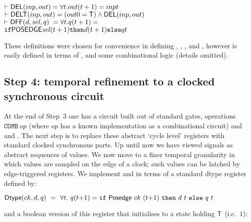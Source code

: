 \documentclass{llncs}
\begin{document}
\vspace*{-1mm}

{\begin{alltt}
\( \vdash \DEF{DEL}(inp,out)  = {\forall}t. out(t+1) = inp t                       \)
\( \vdash \DEF{DELT}(inp,out) = (out 0 = \DEF{T}) \wedge \DEF{DEL}(inp,out)                       \)
\( \vdash \DEF{DFF}(d,\VAR{sel},q)  \phantom{\hspace*{1mm}}= {\forall}t. q(t+1) = \)
\(                        \texttt{if} \DEF{POSEDGE} \VAR{sel} (t+1) \texttt{then} d(t+1) \texttt{else} q t \)
\end{alltt}}

\vspace*{-1mm}

These definitions were chosen for convenience in defining
, , ,  and ,
however  is easily defined in terms of
,  and some combinational logic (details omitted).

\vspace*{-3mm}

\subsection*{Step 4: temporal refinement to a clocked synchronous circuit}

At the end of Step~3 one has a circuit built out of standard gates,
operations $\texttt{COMB}~op$ (where $op$ has a known implementation as
a combinational circuit) and  and .  The
next step is to replace these abstract `cycle level' registers with
standard clocked synchronous parts. Up until now we have viewed
signals as abstract sequences of values.  We now move to a finer
temporal granularity in which values are sampled on the edge of a
clock; such values can be latched by edge-triggered registers. We
implement  and  in terms of a standard dtype
register defined by:

\vspace*{1mm}

$\mathsf{Dtype}(ck,d,q) ~=~ \forall t.~q(t{+}1) = \texttt{if}~\mathsf{Posedge}~ck~(t{+}1)~\texttt{then}~d~t~\texttt{else}~q~t$

\vspace*{1mm}

\noindent and a boolean version of this register that initialises to a state holding $\mathsf{T}$ (i.e.~$1$):

\vspace*{1mm}
\end{document}
